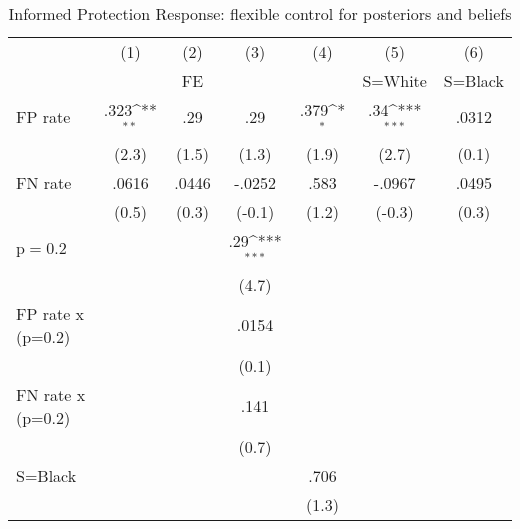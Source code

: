 \begin{table}[htbp]\centering
\def\sym#1{\ifmmode^{#1}\else\(^{#1}\)\fi}
\caption{Informed Protection Response: flexible control for posteriors and beliefs}
\begin{tabular}{l*{6}{c}}
\hline\hline
                &\multicolumn{1}{c}{(1)}&\multicolumn{1}{c}{(2)}&\multicolumn{1}{c}{(3)}&\multicolumn{1}{c}{(4)}&\multicolumn{1}{c}{(5)}&\multicolumn{1}{c}{(6)}\\
                &\multicolumn{1}{c}{}&\multicolumn{1}{c}{FE}&\multicolumn{1}{c}{}&\multicolumn{1}{c}{}&\multicolumn{1}{c}{S=White}&\multicolumn{1}{c}{S=Black}\\
\hline
FP rate         &     .323\sym{**} &      .29         &      .29         &     .379\sym{*}  &      .34\sym{***}&    .0312         \\
                &    (2.3)         &    (1.5)         &    (1.3)         &    (1.9)         &    (2.7)         &    (0.1)         \\
FN rate         &    .0616         &    .0446         &   -.0252         &     .583         &   -.0967         &    .0495         \\
                &    (0.5)         &    (0.3)         &   (-0.1)         &    (1.2)         &   (-0.3)         &    (0.3)         \\
p$=$0.2         &                  &                  &      .29\sym{***}&                  &                  &                  \\
                &                  &                  &    (4.7)         &                  &                  &                  \\
FP rate x (p=0.2)&                  &                  &    .0154         &                  &                  &                  \\
                &                  &                  &    (0.1)         &                  &                  &                  \\
FN rate x (p=0.2)&                  &                  &     .141         &                  &                  &                  \\
                &                  &                  &    (0.7)         &                  &                  &                  \\
S=Black         &                  &                  &                  &     .706         &                  &                  \\
                &                  &                  &                  &    (1.3)         &                  &                  \\

\end{tabular}
\end{table}
